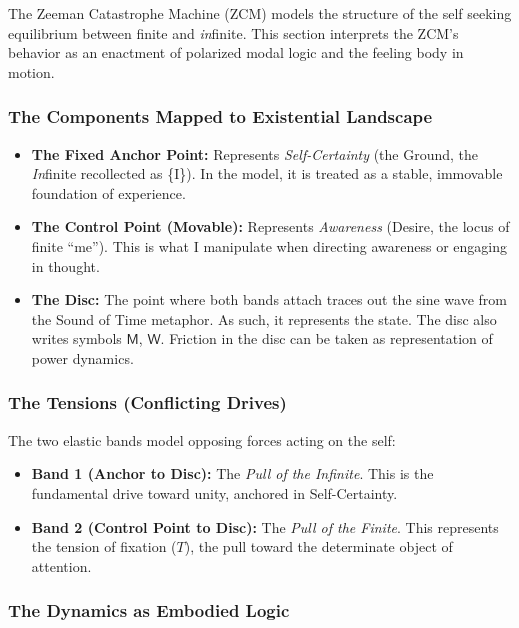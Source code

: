 \documentclass[12pt]{book}
\begin{document}
The Zeeman Catastrophe Machine (ZCM) models the structure of the self seeking equilibrium between finite and \textit{in}finite. This section interprets the ZCM's behavior as an enactment of polarized modal logic and the feeling body in motion.

\subsubsection{The Components Mapped to Existential Landscape}

\begin{itemize}
    \item \textbf{The Fixed Anchor Point:} Represents \textit{Self-Certainty} (the Ground, the \textit{In}finite recollected as \{I\}). In the model, it is treated as a stable, immovable foundation of experience.
    
    \item \textbf{The Control Point (Movable):} Represents \textit{Awareness} (Desire, the locus of finite ``me''). This is what I manipulate when directing awareness or engaging in thought.
    
    \item \textbf{The Disc:} The point where both bands attach traces out the sine wave from the Sound of Time metaphor. As such, it represents the state. The disc also writes symbols $\mathsf{M}$, $\mathsf{W}$. Friction in the disc can be taken as representation of power dynamics.
\end{itemize}

\subsubsection{The Tensions (Conflicting Drives)}

The two elastic bands model opposing forces acting on the self:

\begin{itemize}
    \item \textbf{Band 1 (Anchor to Disc):} The \textit{Pull of the \textit{In}finite}. This is the fundamental drive toward unity, anchored in Self-Certainty.
    
    \item \textbf{Band 2 (Control Point to Disc):} The \textit{Pull of the Finite}. This represents the tension of fixation ($T$), the pull toward the determinate object of attention.
\end{itemize}

\subsubsection{The Dynamics as Embodied Logic}
\end{document}
